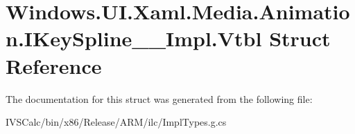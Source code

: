 \hypertarget{struct_windows_1_1_u_i_1_1_xaml_1_1_media_1_1_animation_1_1_i_key_spline_____impl_1_1_vtbl}{}\section{Windows.\+U\+I.\+Xaml.\+Media.\+Animation.\+I\+Key\+Spline\+\_\+\+\_\+\+Impl.\+Vtbl Struct Reference}
\label{struct_windows_1_1_u_i_1_1_xaml_1_1_media_1_1_animation_1_1_i_key_spline_____impl_1_1_vtbl}


The documentation for this struct was generated from the following file\+:\begin{DoxyCompactItemize}
\item 
I\+V\+S\+Calc/bin/x86/\+Release/\+A\+R\+M/ilc/Impl\+Types.\+g.\+cs\end{DoxyCompactItemize}
